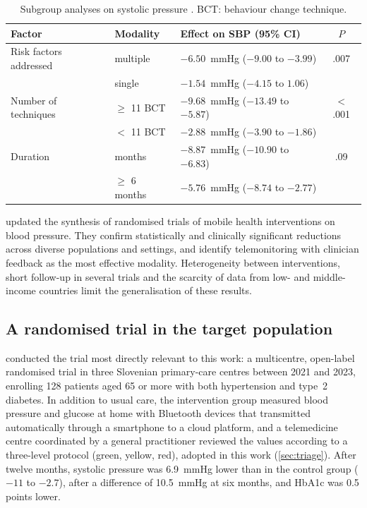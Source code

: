 \documentclass[11pt,a4paper,oneside]{report}
\begin{document}
\begin{table}[htbp]
\centering\small
\caption{Subgroup analyses on systolic pressure \parencite{zhou2024}. BCT: behaviour change technique.}\label{tab:subgroups}
\begin{tabularx}{\textwidth}{@{}>{\raggedright\arraybackslash}p{3.3cm} >{\raggedright\arraybackslash}p{2.5cm} X c@{}}
\toprule
\textbf{Factor} & \textbf{Modality} & \textbf{Effect on SBP (95\% CI)} & \textbf{$P$} \\
\midrule
Risk factors addressed & multiple & $-6.50$~mmHg ($-9.00$ to $-3.99$) & .007 \\
                       & single   & $-1.54$~mmHg ($-4.15$ to $1.06$) & \\
\addlinespace
Number of techniques & $\geq$ 11 BCT & $-9.68$~mmHg ($-13.49$ to $-5.87$) & $<$.001 \\
                     & $<$ 11 BCT    & $-2.88$~mmHg ($-3.90$ to $-1.86$) & \\
\addlinespace
Duration & 3 months & $-8.87$~mmHg ($-10.90$ to $-6.83$) & .09 \\
         & $\geq$ 6 months & $-5.76$~mmHg ($-8.74$ to $-2.77$) & \\
\bottomrule
\end{tabularx}
\end{table}

\Textcite{bandeira2024} updated the synthesis of randomised trials of mobile health interventions on blood pressure. They confirm statistically and clinically significant reductions across diverse populations and settings, and identify telemonitoring with clinician feedback as the most effective modality. Heterogeneity between interventions, short follow-up in several trials and the scarcity of data from low- and middle-income countries limit the generalisation of these results.

\subsection{A randomised trial in the target population}\label{sec:mihevc}

\Textcite{mihevc2025} conducted the trial most directly relevant to this work: a multicentre, open-label randomised trial in three Slovenian primary-care centres between 2021 and 2023, enrolling 128 patients aged 65 or more with both hypertension and type~2 diabetes. In addition to usual care, the intervention group measured blood pressure and glucose at home with Bluetooth devices that transmitted automatically through a smartphone to a cloud platform, and a telemedicine centre coordinated by a general practitioner reviewed the values according to a three-level protocol (green, yellow, red), adopted in this work (\cref{sec:triage}). After twelve months, systolic pressure was 6.9~mmHg lower than in the control group ($-11$ to $-2.7$), after a difference of 10.5~mmHg at six months, and HbA1c was 0.5 points lower.
\end{document}
